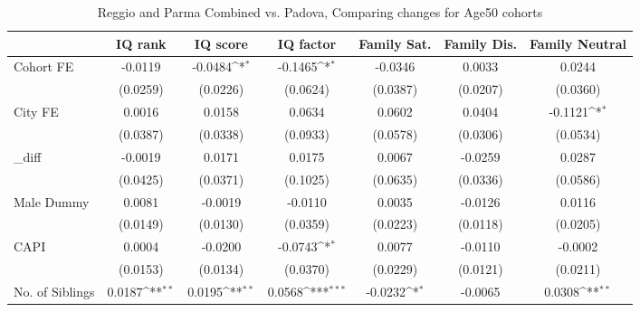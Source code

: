 \begin{table}[htbp]\centering
\def\sym#1{\ifmmode^{#1}\else\(^{#1}\)\fi}
\caption{Reggio and Parma Combined vs. Padova, Comparing changes for Age50 cohorts}
\begin{tabular}{l*{6}{c}}
\toprule
            &\multicolumn{1}{c}{IQ rank}&\multicolumn{1}{c}{IQ score}&\multicolumn{1}{c}{IQ factor}&\multicolumn{1}{c}{Family Sat.}&\multicolumn{1}{c}{Family Dis.}&\multicolumn{1}{c}{Family Neutral}\\
\midrule
Cohort FE   &     -0.0119         &     -0.0484\sym{*}  &     -0.1465\sym{*}  &     -0.0346         &      0.0033         &      0.0244         \\
            &    (0.0259)         &    (0.0226)         &    (0.0624)         &    (0.0387)         &    (0.0207)         &    (0.0360)         \\
\addlinespace
City FE     &      0.0016         &      0.0158         &      0.0634         &      0.0602         &      0.0404         &     -0.1121\sym{*}  \\
            &    (0.0387)         &    (0.0338)         &    (0.0933)         &    (0.0578)         &    (0.0306)         &    (0.0534)         \\
\addlinespace
\_diff       &     -0.0019         &      0.0171         &      0.0175         &      0.0067         &     -0.0259         &      0.0287         \\
            &    (0.0425)         &    (0.0371)         &    (0.1025)         &    (0.0635)         &    (0.0336)         &    (0.0586)         \\
\addlinespace
Male Dummy  &      0.0081         &     -0.0019         &     -0.0110         &      0.0035         &     -0.0126         &      0.0116         \\
            &    (0.0149)         &    (0.0130)         &    (0.0359)         &    (0.0223)         &    (0.0118)         &    (0.0205)         \\
\addlinespace
CAPI        &      0.0004         &     -0.0200         &     -0.0743\sym{*}  &      0.0077         &     -0.0110         &     -0.0002         \\
            &    (0.0153)         &    (0.0134)         &    (0.0370)         &    (0.0229)         &    (0.0121)         &    (0.0211)         \\
\addlinespace
No. of Siblings&      0.0187\sym{**} &      0.0195\sym{**} &      0.0568\sym{***}&     -0.0232\sym{*}  &     -0.0065         &      0.0308\sym{**} \\

\end{tabular}
\end{table}
